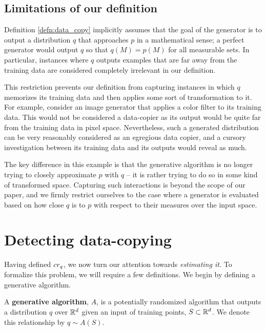 \subsection{Limitations of our definition}\label{sec:limitations}

Definition \ref{defn:data_copy} implicitly assumes that the goal of the generator is to output a distribution $q$ that approaches $p$ in a mathematical sense; a perfect generator would output $q$ so that $q(M) = p(M)$ for all measurable sets. In particular, instances where $q$ outputs examples that are far away from the training data are considered completely irrelevant in our definition.

This restriction prevents our definition from capturing instances in which $q$ memorizes its training data and then applies some sort of transformation to it. For example, consider an image generator that applies a color filter to its training data. This would not be considered a data-copier as its output would be quite far from the training data in pixel space. Nevertheless, such a generated distribution can be very reasonably considered as an egregious data copier, and a cursory investigation between its training data and its outputs would reveal as much. 

The key difference in this example is that the generative algorithm is no longer trying to closely approximate $p$ with $q$ -- it is rather trying to do so in some kind of transformed space. Capturing such interactions is beyond the scope of our paper, and we firmly restrict ourselves to the case where a generator is evaluated based on how close $q$ is to $p$ with respect to their measures over the input space. 

\section{Detecting data-copying}

Having defined $cr_q$, we now turn our attention towards \textit{estimating it.} To formalize this problem, we will require a few definitions. We begin by defining a generative algorithm.

\begin{definition}
A \textbf{generative algorithm}, $A$, is a potentially randomized algorithm that outputs a distribution $q$ over $\mathbb{R}^d$ given an input of training points, $S \subset \mathbb{R}^d$. We denote this relationship by $q \sim A(S)$.
\end{definition}

